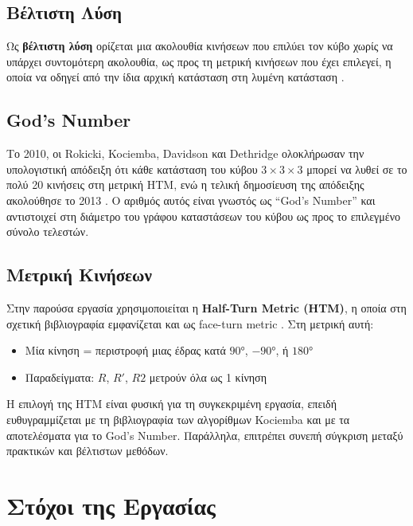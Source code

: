 \subsection{Βέλτιστη Λύση}

Ως \textbf{βέλτιστη λύση} ορίζεται μια ακολουθία κινήσεων που επιλύει τον κύβο χωρίς να υπάρχει συντομότερη ακολουθία, ως προς τη μετρική κινήσεων που έχει επιλεγεί, η οποία να οδηγεί από την ίδια αρχική κατάσταση στη λυμένη κατάσταση \cite{korf1997finding,rokicki2014diameter}.

\subsection{God's Number}

Το 2010, οι Rokicki, Kociemba, Davidson και Dethridge ολοκλήρωσαν την υπολογιστική απόδειξη ότι κάθε κατάσταση του κύβου $3 \times 3 \times 3$ μπορεί να λυθεί σε το πολύ 20 κινήσεις στη μετρική HTM, ενώ η τελική δημοσίευση της απόδειξης ακολούθησε το 2013 \cite{rokicki2014diameter}. Ο αριθμός αυτός είναι γνωστός ως ``God's Number'' και αντιστοιχεί στη διάμετρο του γράφου καταστάσεων του κύβου ως προς το επιλεγμένο σύνολο τελεστών.

\subsection{Μετρική Κινήσεων}

Στην παρούσα εργασία χρησιμοποιείται η \textbf{Half-Turn Metric (HTM)}, η οποία στη σχετική βιβλιογραφία εμφανίζεται και ως face-turn metric \cite{kociemba1992close,rokicki2014diameter}. Στη μετρική αυτή:
\begin{itemize}
    \item Μία κίνηση = περιστροφή μιας έδρας κατά $90°$, $-90°$, ή $180°$
    \item Παραδείγματα: $R$, $R'$, $R2$ μετρούν όλα ως 1 κίνηση
\end{itemize}

Η επιλογή της HTM είναι φυσική για τη συγκεκριμένη εργασία, επειδή ευθυγραμμίζεται με τη βιβλιογραφία των αλγορίθμων Kociemba και με τα αποτελέσματα για το God's Number. Παράλληλα, επιτρέπει συνεπή σύγκριση μεταξύ πρακτικών και βέλτιστων μεθόδων.


\section{Στόχοι της Εργασίας}
\label{sec:intro_objectives}

